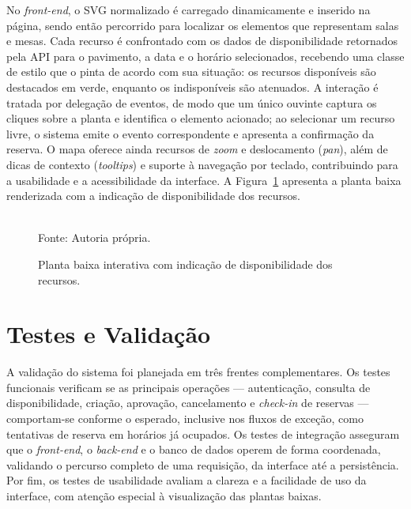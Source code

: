 No \textit{front-end}, o SVG normalizado é carregado dinamicamente e inserido na página, sendo então percorrido para localizar os elementos que representam salas e mesas. Cada recurso é confrontado com os dados de disponibilidade retornados pela API para o pavimento, a data e o horário selecionados, recebendo uma classe de estilo que o pinta de acordo com sua situação: os recursos disponíveis são destacados em verde, enquanto os indisponíveis são atenuados. A interação é tratada por delegação de eventos, de modo que um único ouvinte captura os cliques sobre a planta e identifica o elemento acionado; ao selecionar um recurso livre, o sistema emite o evento correspondente e apresenta a confirmação da reserva. O mapa oferece ainda recursos de \textit{zoom} e deslocamento (\textit{pan}), além de dicas de contexto (\textit{tooltips}) e suporte à navegação por teclado, contribuindo para a usabilidade e a acessibilidade da interface. A Figura~\ref{fig:planta-interativa} apresenta a planta baixa renderizada com a indicação de disponibilidade dos recursos.

\begin{figure}[H]
  \centering
  \framebox[0.9\textwidth]{\rule{0pt}{8cm}}%
  \caption{Planta baixa interativa com indicação de disponibilidade dos recursos.}
  \label{fig:planta-interativa}\\
  {\footnotesize Fonte: Autoria própria.}
\end{figure}

\section{Testes e Validação}\label{sec:testesValidacao}

A validação do sistema foi planejada em três frentes complementares. Os testes funcionais verificam se as principais operações — autenticação, consulta de disponibilidade, criação, aprovação, cancelamento e \textit{check-in} de reservas — comportam-se conforme o esperado, inclusive nos fluxos de exceção, como tentativas de reserva em horários já ocupados. Os testes de integração asseguram que o \textit{front-end}, o \textit{back-end} e o banco de dados operem de forma coordenada, validando o percurso completo de uma requisição, da interface até a persistência. Por fim, os testes de usabilidade avaliam a clareza e a facilidade de uso da interface, com atenção especial à visualização das plantas baixas. %

